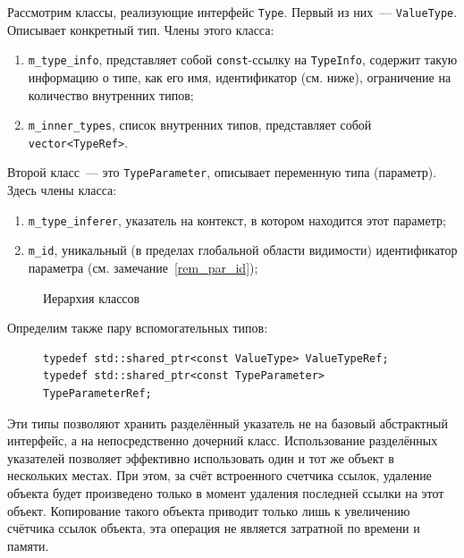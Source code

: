 Рассмотрим классы, реализующие интерфейс \lstinline!Type!. Первый из них~--- \lstinline!ValueType!. Описывает конкретный тип. Члены этого класса:
	\begin{enumerate}[1)]
		\item \lstinline!m_type_info!, представляет собой \lstinline!const!-ссылку на \lstinline!TypeInfo!, содержит такую информацию о типе, как его имя, идентификатор (см. ниже), ограничение на количество внутренних типов;
		\item \lstinline!m_inner_types!, список внутренних типов, представляет собой \lstinline!vector<TypeRef>!.
	\end{enumerate}
Второй класс~--- это \lstinline!TypeParameter!, описывает переменную типа (параметр). Здесь члены класса:
\begin{enumerate}[1)]
	\item \lstinline!m_type_inferer!, указатель на контекст, в котором находится этот параметр;
	\item \lstinline!m_id!, уникальный (в пределах глобальной области видимости) идентификатор параметра (см. замечание~\ref{rem_par_id});
\end{enumerate}
\label{rem_par_id}

\begin{figure}[H]
	\centering
	\caption{Иерархия классов}\label{hier}
\end{figure}

Определим также пару вспомогательных типов:
\begin{figure}[H]
	\begin{lstlisting} 
typedef std::shared_ptr<const ValueType> ValueTypeRef;
typedef std::shared_ptr<const TypeParameter> TypeParameterRef;
	\end{lstlisting}
\end{figure}
Эти типы позволяют хранить разделённый указатель не на базовый абстрактный интерфейс, а на непосредственно дочерний класс.
Использование разделённых указателей позволяет эффективно использовать один и тот же объект в нескольких местах. При этом, за счёт встроенного счетчика ссылок, удаление объекта будет произведено только в момент удаления последней ссылки на этот объект. Копирование такого объекта приводит только лишь к увеличению счётчика ссылок объекта, эта операция не является затратной по времени и памяти.

